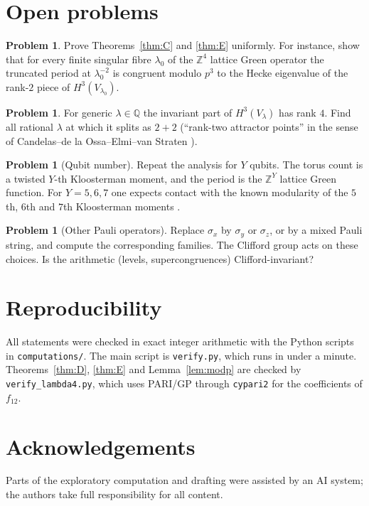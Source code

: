 \documentclass[11pt]{amsart}
\theoremstyle{definition}
\newtheorem{problem}[theorem]{Problem}
\newcommand{\Q}{\mathbb{Q}}
\newcommand{\Z}{\mathbb{Z}}
\begin{document}
\section{Open problems}

\begin{problem}
Prove Theorems~\ref{thm:C} and \ref{thm:E} uniformly. For instance, show that for every finite singular fibre $\lambda_0$ of the $\Z^4$ lattice Green operator the truncated period at $\lambda_0^{-2}$ is congruent modulo $p^3$ to the Hecke eigenvalue of the rank-$2$ piece of $H^3(V_{\lambda_0})$.
\end{problem}

\begin{problem}
For generic $\lambda\in\Q$ the invariant part of $H^3(V_\lambda)$ has rank $4$. Find all rational $\lambda$ at which it splits as $2+2$ (``rank-two attractor points'' in the sense of Candelas--de la Ossa--Elmi--van Straten \cite{CdOEvS}).
\end{problem}

\begin{problem}[Qubit number]
Repeat the analysis for $Y$ qubits. The torus count is a twisted $Y$-th Kloosterman moment, and the period is the $\Z^Y$ lattice Green function. For $Y=5,6,7$ one expects contact with the known modularity of the $5$th, $6$th and $7$th Kloosterman moments \cite{PTV,HSGS,Yun}.
\end{problem}

\begin{problem}[Other Pauli operators]
Replace $\sigma_x$ by $\sigma_y$ or $\sigma_z$, or by a mixed Pauli string, and compute the corresponding families. The Clifford group acts on these choices. Is the arithmetic (levels, supercongruences) Clifford-invariant?
\end{problem}

\section*{Reproducibility}
All statements were checked in exact integer arithmetic with the Python scripts in \texttt{computations/}. The main script is \texttt{verify.py}, which runs in under a minute. Theorems~\ref{thm:D}, \ref{thm:E} and Lemma~\ref{lem:modp} are checked by \texttt{verify\_lambda4.py}, which uses PARI/GP through \texttt{cypari2} for the coefficients of $f_{12}$.

\section*{Acknowledgements}
Parts of the exploratory computation and drafting were assisted by an AI system; the authors take full responsibility for all content.
\end{document}
